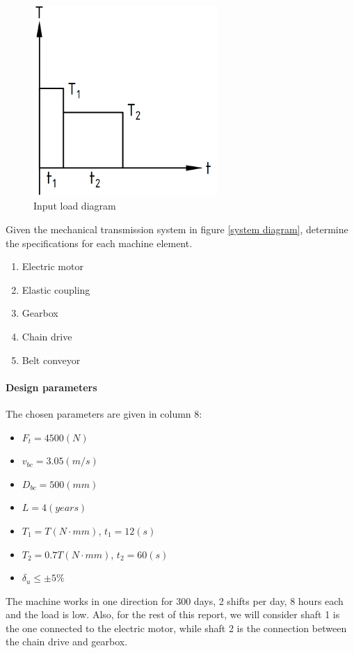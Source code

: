 \documentclass{presets}
\begin{document}
	\begin{figure}[ht]
		\centering
		\includegraphics[width=70mm]{load.png}
		\caption{Input load diagram}
		\label{load diagram}
	\end{figure}
	Given the mechanical transmission system in figure \ref{system diagram}, determine the specifications for each machine element.
	\begin{enumerate}
		\item Electric motor
		\item Elastic coupling
		\item Gearbox
		\item Chain drive
		\item Belt conveyor
	\end{enumerate}

	\paragraph{Design parameters} The chosen parameters are given in column 8:
	\begin{itemize}
		\item $ F_t = 4500 \unit{(N)} $
		\item $ v_{bc} = 3.05 \unit{(m/s)} $
		\item $ D_{bc} = 500 \unit{(mm)} $
		\item $ L = 4 \unit{(years)} $
		\item $ T_1 = T \unit{(N\cdot mm)}$, $ t_1 = 12 \unit{(s)} $
		\item $ T_2 = 0.7T \unit{(N\cdot mm)}$, $ t_2 = 60 \unit{(s)} $
		\item $ \delta_u \leq \pm 5\% $
	\end{itemize}
	The machine works in one direction for 300 days, 2 shifts per day, 8 hours each and the load is low. Also, for the rest of this report, we will consider shaft 1 is the one connected to the electric motor, while shaft 2 is the connection between the chain drive and gearbox.
	
	
	
	
	
	
\end{document}

